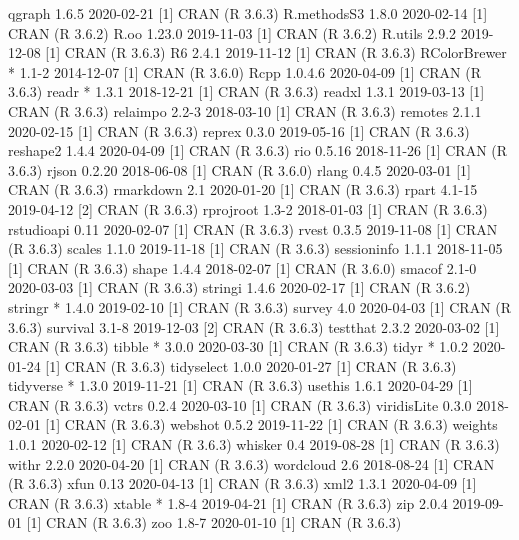 \documentclass[a4paper,12pt]{article} %
\begin{document}
{\begin{Schunk}
\begin{Soutput}
 qgraph           1.6.5      2020-02-21 [1] CRAN (R 3.6.3)
 R.methodsS3      1.8.0      2020-02-14 [1] CRAN (R 3.6.2)
 R.oo             1.23.0     2019-11-03 [1] CRAN (R 3.6.2)
 R.utils          2.9.2      2019-12-08 [1] CRAN (R 3.6.3)
 R6               2.4.1      2019-11-12 [1] CRAN (R 3.6.3)
 RColorBrewer   * 1.1-2      2014-12-07 [1] CRAN (R 3.6.0)
 Rcpp             1.0.4.6    2020-04-09 [1] CRAN (R 3.6.3)
 readr          * 1.3.1      2018-12-21 [1] CRAN (R 3.6.3)
 readxl           1.3.1      2019-03-13 [1] CRAN (R 3.6.3)
 relaimpo         2.2-3      2018-03-10 [1] CRAN (R 3.6.3)
 remotes          2.1.1      2020-02-15 [1] CRAN (R 3.6.3)
 reprex           0.3.0      2019-05-16 [1] CRAN (R 3.6.3)
 reshape2         1.4.4      2020-04-09 [1] CRAN (R 3.6.3)
 rio              0.5.16     2018-11-26 [1] CRAN (R 3.6.3)
 rjson            0.2.20     2018-06-08 [1] CRAN (R 3.6.0)
 rlang            0.4.5      2020-03-01 [1] CRAN (R 3.6.3)
 rmarkdown        2.1        2020-01-20 [1] CRAN (R 3.6.3)
 rpart            4.1-15     2019-04-12 [2] CRAN (R 3.6.3)
 rprojroot        1.3-2      2018-01-03 [1] CRAN (R 3.6.3)
 rstudioapi       0.11       2020-02-07 [1] CRAN (R 3.6.3)
 rvest            0.3.5      2019-11-08 [1] CRAN (R 3.6.3)
 scales           1.1.0      2019-11-18 [1] CRAN (R 3.6.3)
 sessioninfo      1.1.1      2018-11-05 [1] CRAN (R 3.6.3)
 shape            1.4.4      2018-02-07 [1] CRAN (R 3.6.0)
 smacof           2.1-0      2020-03-03 [1] CRAN (R 3.6.3)
 stringi          1.4.6      2020-02-17 [1] CRAN (R 3.6.2)
 stringr        * 1.4.0      2019-02-10 [1] CRAN (R 3.6.3)
 survey           4.0        2020-04-03 [1] CRAN (R 3.6.3)
 survival         3.1-8      2019-12-03 [2] CRAN (R 3.6.3)
 testthat         2.3.2      2020-03-02 [1] CRAN (R 3.6.3)
 tibble         * 3.0.0      2020-03-30 [1] CRAN (R 3.6.3)
 tidyr          * 1.0.2      2020-01-24 [1] CRAN (R 3.6.3)
 tidyselect       1.0.0      2020-01-27 [1] CRAN (R 3.6.3)
 tidyverse      * 1.3.0      2019-11-21 [1] CRAN (R 3.6.3)
 usethis          1.6.1      2020-04-29 [1] CRAN (R 3.6.3)
 vctrs            0.2.4      2020-03-10 [1] CRAN (R 3.6.3)
 viridisLite      0.3.0      2018-02-01 [1] CRAN (R 3.6.3)
 webshot          0.5.2      2019-11-22 [1] CRAN (R 3.6.3)
 weights          1.0.1      2020-02-12 [1] CRAN (R 3.6.3)
 whisker          0.4        2019-08-28 [1] CRAN (R 3.6.3)
 withr            2.2.0      2020-04-20 [1] CRAN (R 3.6.3)
 wordcloud        2.6        2018-08-24 [1] CRAN (R 3.6.3)
 xfun             0.13       2020-04-13 [1] CRAN (R 3.6.3)
 xml2             1.3.1      2020-04-09 [1] CRAN (R 3.6.3)
 xtable         * 1.8-4      2019-04-21 [1] CRAN (R 3.6.3)
 zip              2.0.4      2019-09-01 [1] CRAN (R 3.6.3)
 zoo              1.8-7      2020-01-10 [1] CRAN (R 3.6.3)


\end{Soutput}
\end{Schunk}}
\end{document}
